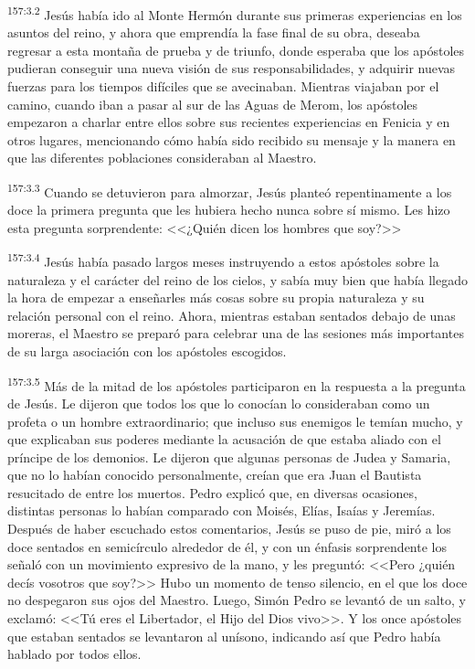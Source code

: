 \par 
\textsuperscript{157:3.2} Jesús había ido al Monte Hermón durante sus primeras experiencias en los asuntos del reino, y ahora que emprendía la fase final de su obra, deseaba regresar a esta montaña de prueba y de triunfo, donde esperaba que los apóstoles pudieran conseguir una nueva visión de sus responsabilidades, y adquirir nuevas fuerzas para los tiempos difíciles que se avecinaban. Mientras viajaban por el camino, cuando iban a pasar al sur de las Aguas de Merom, los apóstoles empezaron a charlar entre ellos sobre sus recientes experiencias en Fenicia y en otros lugares, mencionando cómo había sido recibido su mensaje y la manera en que las diferentes poblaciones consideraban al Maestro.

\par 
\textsuperscript{157:3.3} Cuando se detuvieron para almorzar, Jesús planteó repentinamente a los doce la primera pregunta que les hubiera hecho nunca sobre sí mismo. Les hizo esta pregunta sorprendente: <<¿Quién dicen los hombres que soy?>>

\par 
\textsuperscript{157:3.4} Jesús había pasado largos meses instruyendo a estos apóstoles sobre la naturaleza y el carácter del reino de los cielos, y sabía muy bien que había llegado la hora de empezar a enseñarles más cosas sobre su propia naturaleza y su relación personal con el reino. Ahora, mientras estaban sentados debajo de unas moreras, el Maestro se preparó para celebrar una de las sesiones más importantes de su larga asociación con los apóstoles escogidos.

\par 
\textsuperscript{157:3.5} Más de la mitad de los apóstoles participaron en la respuesta a la pregunta de Jesús. Le dijeron que todos los que lo conocían lo consideraban como un profeta o un hombre extraordinario; que incluso sus enemigos le temían mucho, y que explicaban sus poderes mediante la acusación de que estaba aliado con el príncipe de los demonios. Le dijeron que algunas personas de Judea y Samaria, que no lo habían conocido personalmente, creían que era Juan el Bautista resucitado de entre los muertos. Pedro explicó que, en diversas ocasiones, distintas personas lo habían comparado con Moisés, Elías, Isaías y Jeremías. Después de haber escuchado estos comentarios, Jesús se puso de pie, miró a los doce sentados en semicírculo alrededor de él, y con un énfasis sorprendente los señaló con un movimiento expresivo de la mano, y les preguntó: <<Pero ¿quién decís vosotros que soy?>> Hubo un momento de tenso silencio, en el que los doce no despegaron sus ojos del Maestro. Luego, Simón Pedro se levantó de un salto, y exclamó: <<Tú eres el Libertador, el Hijo del Dios vivo>>. Y los once apóstoles que estaban sentados se levantaron al unísono, indicando así que Pedro había hablado por todos ellos.

